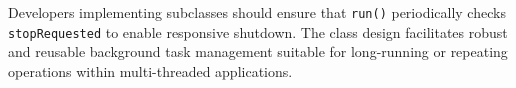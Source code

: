 Developers implementing subclasses should ensure that \texttt{run()} periodically checks \texttt{stopRequested} to enable responsive shutdown. The class design facilitates robust and reusable background task management suitable for long-running or repeating operations within multi-threaded applications.



